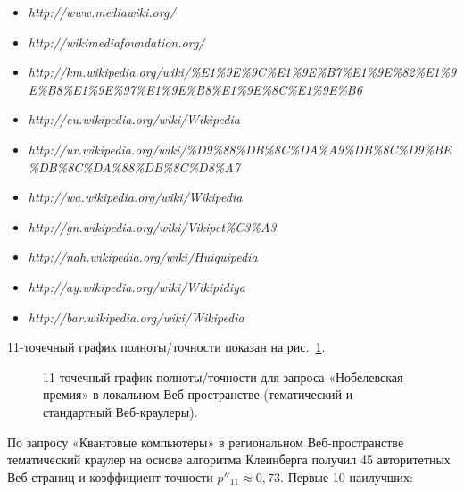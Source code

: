 \begin{itemize}
	\item \textit{http://www.mediawiki.org/}
	\item \textit{http://wikimediafoundation.org/}
	\item \textit{http://km.wikipedia.org/wiki/\%E1\%9E\%9C\linebreak\%E1\%9E\%B7\%E1\%9E\%82\%E1\%9E\%B8\%E1\linebreak\%9E\%97\%E1\%9E\%B8\%E1\%9E\%8C\%E1\%9E\%B6}
	\item \textit{http://eu.wikipedia.org/wiki/Wikipedia}
	\item \textit{http://ur.wikipedia.org/wiki/\%D9\%88\%DB\linebreak\%8C\%DA\%A9\%DB\%8C\%D9\%BE\%DB\%8C\%DA\%88\%DB\%8C\%D8\%A7}
	\item \textit{http://wa.wikipedia.org/wiki/Wikipedia} 
	\item \textit{http://gn.wikipedia.org/wiki/Vikipet\%C3\%A3} 
	\item \textit{http://nah.wikipedia.org/wiki/Huiquipedia}
	\item \textit{http://ay.wikipedia.org/wiki/Wikipidiya}
	\item \textit{http://bar.wikipedia.org/wiki/Wikipedia}
\end{itemize}

11-точечный график полноты/точности показан на рис.~\cref{fig:nobelPrizeLocalPR}.

\begin{figure}[ht]
	\caption{11-точечный график полноты/точности для запроса «Нобелевская премия» в локальном Веб-пространстве (тематический и стандартный Веб-краулеры).}\label{fig:nobelPrizeLocalPR}
\end{figure}

По запросу «Квантовые компьютеры» в региональном Веб-пространстве тематический краулер на основе алгоритма Клеинберга получил 45 авторитетных Веб-страниц и коэффициент точности \(p''_{11} \approx 0,73\). Первые 10 наилучших:

